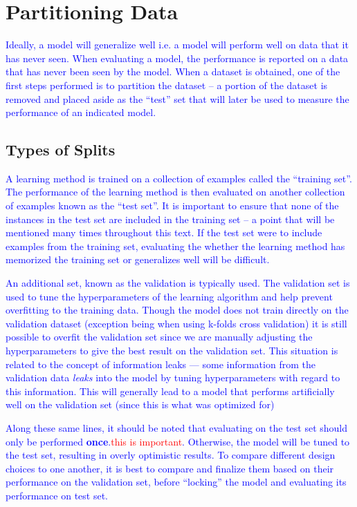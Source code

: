 \section{Partitioning Data}

\textcolor{blue}{Ideally, a model will generalize well i.e. a model will perform well on data that it has never seen. When evaluating a model, the performance is reported on a data that has never been seen by the model. When a dataset is obtained, one of the first steps performed is to partition the dataset -- a portion of the dataset is removed and placed aside as the ``test'' set that will later be used to measure the performance of an indicated model.}

\subsection{Types of Splits}

\textcolor{blue}{A learning method is trained on a collection of examples called the ``training set''. The performance of the learning method is then evaluated on another collection of examples known as the ``test set''. It is important to ensure that none of the instances in the test set are included in the training set -- a point that will be mentioned many times throughout this text. If the test set were to include examples from the training set, evaluating the whether the learning method has memorized the training set or generalizes well will be difficult.}

\textcolor{blue}{An additional set, known as the validation is typically used. The validation set is used to tune the hyperparameters of the learning algorithm and help prevent overfitting to the training data. Though the model does not train directly on the validation dataset (exception being when using k-folds cross validation) it is still possible to overfit the validation set since we are manually adjusting the hyperparameters to give the best result on the validation set. This situation is related to the concept of {information leaks} --- some information from the validation data \textit{leaks} into the model by tuning hyperparameters with regard to this information. This will generally lead to a  model that performs artificially well on the validation set (since this is what was optimized for)}

\textcolor{blue}{Along these same lines, it should be noted that evaluating on the test set should only be performed \textbf{once}.\textcolor{red}{this is important}. Otherwise, the model will be tuned to the test set, resulting in overly optimistic results. To compare different design choices to one another, it is best to compare and finalize them based on their performance on the validation set, before ``locking'' the model and evaluating its performance on test set.}

